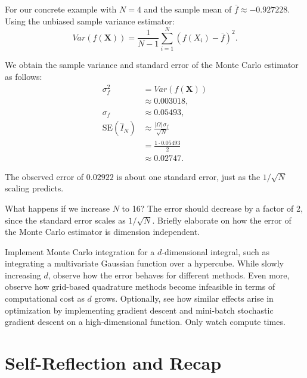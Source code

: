  For our concrete example with $N=4$ and the sample mean of
\(\bar f \approx -0.927228\). Using the unbiased sample variance estimator:
\begin{equation}
    Var(f(\mathbf{X})) = \frac{1}{N-1} \sum_{i=1}^N (f(X_i) - \bar f)^2.
\end{equation}

We obtain the sample variance and standard error of the Monte Carlo estimator as follows:
\begin{align*}
    \sigma_f^2 &= Var(f(\mathbf{X}))  \\ 
               &\approx 0.003018, \\
    \sigma_{f} &\approx 0.05493, \\
    \mathrm{SE}(\hat I_N) &\approx \frac{|\Omega|\, \sigma_f}{\sqrt{N}} \\
    &= \frac{1\cdot 0.05493}{2} \\
    &\approx 0.02747.
\end{align*}

The observed error of $0.02922$ is about one standard error, just as the $1/\sqrt{N}$ scaling predicts.

What happens if we increase $N$ to 16?
The error should decrease by a factor of 2, since the standard error scales as $1/\sqrt{N}$.
Briefly elaborate on how the error of the Monte Carlo estimator is dimension independent.






\vspace{2em}
 Implement Monte Carlo integration for a $d$-dimensional integral, 
such as integrating a multivariate Gaussian function over a hypercube. While slowly increasing $d$, observe how the error behaves for different methods.
Even more, observe how grid-based quadrature methods become infeasible in terms of computational cost as $d$ grows.
Optionally, see how similar effects arise in optimization by implementing gradient descent and mini-batch
stochastic gradient descent on a high-dimensional function. Only watch compute times.


\vfill
\section{Self-Reflection and Recap}

